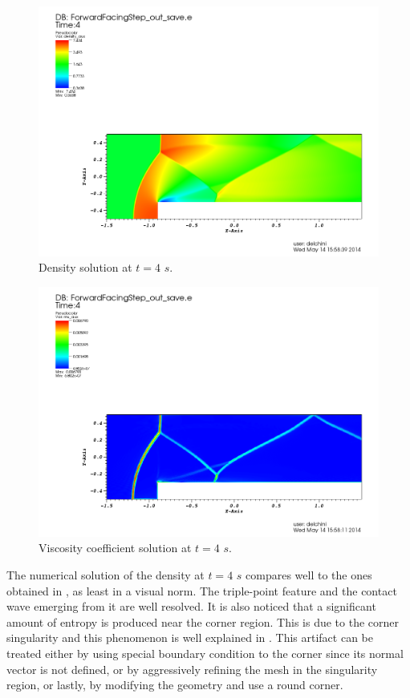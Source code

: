 \begin{figure}[H]
\centering
\includegraphics[scale=.50]{figures/FFSDensityEqualTo4.png}
\caption{Density solution at $t=4$ $s$.}
\label{fig:2d_ffs_rho_4}
\end{figure}
%
\begin{figure}[H]
\centering
\includegraphics[scale=.50]{figures/FFSViscEqualTo4.png}
\caption{Viscosity coefficient solution at $t=4$ $s$.}
\label{fig:2d_ffs_visc_4}
\end{figure}
The numerical solution of the density at $t=4$ $s$ compares well to the ones obtained in \cite{valentin}, as least in a visual norm. The triple-point feature and the contact wave emerging from it are well resolved. It is also noticed that a significant amount of entropy is produced near the corner region. This is due to the corner singularity and this phenomenon is well explained in \cite{FFS_corner}. This artifact can be treated either by using special boundary condition to the corner since its normal vector is not defined, or by aggressively refining the mesh in the singularity region, or lastly, by modifying the geometry and use a round corner. 
